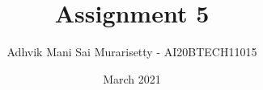 \documentclass[journal,12pt,twocolumn]{IEEEtran}
\date{March 2021}
\DeclareMathOperator*{\Res}{Res}
\begin{document}
\newcommand{\BEQA}{\begin{eqnarray}}
\newcommand{\EEQA}{\end{eqnarray}}
\newcommand{\define}{\stackrel{\triangle}{=}}

\raggedbottom
\setlength{\parindent}{0pt}
\providecommand{\mbf}{\mathbf}
\providecommand{\pr}[1]{\ensuremath{\Pr\left(#1\right)}}
\providecommand{\qfunc}[1]{\ensuremath{Q\left(#1\right)}}
\providecommand{\fn}[1]{\ensuremath{f\left({#1}\right)}}
\providecommand{\e}[1]{\ensuremath{E\left(#1\right)}}
\providecommand{\sbrak}[1]{\ensuremath{{}\left[#1\right]}}
\providecommand{\lsbrak}[1]{\ensuremath{{}\left[#1\right.}}
\providecommand{\rsbrak}[1]{\ensuremath{{}\left.#1\right]}}
\providecommand{\brak}[1]{\ensuremath{\left(#1\right)}}
\providecommand{\lbrak}[1]{\ensuremath{\left(#1\right.}}
\providecommand{\rbrak}[1]{\ensuremath{\left.#1\right)}}
\providecommand{\cbrak}[1]{\ensuremath{\left\{#1\right\}}}
\providecommand{\lcbrak}[1]{\ensuremath{\left\{#1\right.}}
\providecommand{\rcbrak}[1]{\ensuremath{\left.#1\right\}}}
\theoremstyle{remark}
\newtheorem{rem}{Remark}
\newcommand{\sgn}{\mathop{\mathrm{sgn}}}
\newcommand{\comb}[2]{{}^{#1}\mathrm{C}_{#2}}
\providecommand{\abs}[1]{\vert#1\vert}
\providecommand{\res}[1]{\Res\displaylimits_{#1}} 
\providecommand{\norm}[1]{\lVert#1\rVert}
\providecommand{\mtx}[1]{\mathbf{#1}}
\providecommand{\mean}[1]{E[ #1 ]}
\providecommand{\fourier}{\overset{\mathcal{F}}{ \rightleftharpoons}}
\providecommand{\system}{\overset{\mathcal{H}}{ \longleftrightarrow}}
\newcommand{\solution}{\noindent \textbf{Solution: }}
\newcommand{\cosec}{\,\text{cosec}\,}
\providecommand{\dec}[2]{\ensuremath{\overset{#1}{\underset{#2}{\gtrless}}}}
\newcommand{\myvec}[1]{\ensuremath{\begin{pmatrix}#1\end{pmatrix}}}
\newcommand{\mydet}[1]{\ensuremath{\begin{vmatrix}#1\end{vmatrix}}}
\makeatletter
\vspace{3cm}
\title{Assignment 5}
\author{Adhvik Mani Sai Murarisetty - AI20BTECH11015}
\maketitle
\newpage
\bigskip
\renewcommand{\thetable}{\theenumi}
\end{document}
